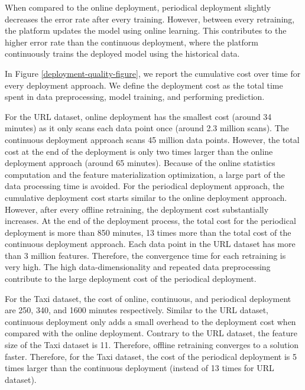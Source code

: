 When compared to the online deployment, periodical deployment slightly decreases the error rate after every training.
However, between every retraining, the platform updates the model using online learning.
This contributes to the higher error rate than the continuous deployment, where the platform continuously trains the deployed model using the historical data.

\begin{figure*}[t]
\centering
\resizebox{\textwidth}{!}{}
\caption{Model Quality and Training cost for different deployment approaches}
\label{deployment-quality-figure}
\end{figure*}

In Figure \ref{deployment-quality-figure}, we report the cumulative cost over time for every deployment approach.
We define the deployment cost as the total time spent in data preprocessing, model training, and performing prediction.

For the URL dataset, online deployment has the smallest cost (around 34 minutes) as it only scans each data point once (around 2.3 million scans).  
The continuous deployment approach scans 45 million data points.
However, the total cost at the end of the deployment is only two times larger than the online deployment approach (around 65 minutes).  
Because of the online statistics computation and the feature materialization optimization, a large part of the data processing time is avoided.
For the periodical deployment approach, the cumulative deployment cost starts similar to the online deployment approach.
However, after every offline retraining, the deployment cost substantially increases.
At the end of the deployment process, the total cost for the periodical deployment is more than 850 minutes, 13 times more than the total cost of the continuous deployment approach.
Each data point in the URL dataset has more than 3 million features.
Therefore, the convergence time for each retraining is very high.
The high data-dimensionality and repeated data preprocessing contribute to the large deployment cost of the periodical deployment.

For the Taxi dataset, the cost of online, continuous, and periodical deployment are 250, 340, and 1600 minutes respectively.
Similar to the URL dataset, continuous deployment only adds a small overhead to the deployment cost when compared with the online deployment.
Contrary to the URL dataset, the feature size of the Taxi dataset is 11.
Therefore, offline retraining converges to a solution faster.
Therefore, for the Taxi dataset, the cost of the periodical deployment is 5 times larger than the continuous deployment (instead of 13 times for URL dataset). 

